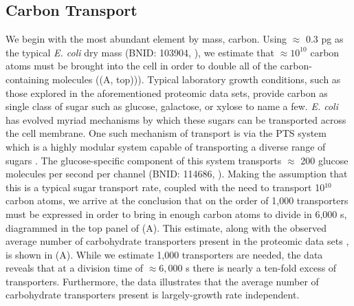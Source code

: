 \subsection{Carbon Transport}
We begin with the most abundant element by mass, carbon. Using $\approx$ 0.3
pg as the typical \textit{E. coli} dry mass (BNID: 103904, \cite{milo2010}),
we estimate that $\approx 10^{10}$ carbon atoms must be brought into the cell
in order to double all of the carbon-containing molecules
((A, top))). Typical laboratory growth conditions, such as
those explored in the aforementioned proteomic data sets, provide carbon as
single class of sugar such as glucose, galactose, or xylose to name a few.
\textit{E. coli} has evolved myriad mechanisms by which these sugars can be
transported across the cell membrane. One such mechanism of transport is via
the PTS system which is a highly modular system capable of transporting a
diverse range of sugars \citep{escalante2012}. The glucose-specific component
of this system transports $\approx$ 200 glucose molecules per second per
channel (BNID: 114686, \cite{milo2010}). Making the assumption that this is a
typical sugar transport rate, coupled with the need to transport 10$^{10}$
carbon atoms, we arrive at the conclusion that on the order of 1,000
transporters must be expressed in order to bring in enough carbon atoms to
divide in 6,000 s, diagrammed in the top panel of (A). This
estimate, along with the observed average number of carbohydrate transporters
present in the proteomic data sets \citep{schmidt2016,
peebo2015,valgepea2013,li2014}, is shown in (A). While we
estimate 1,000 transporters are needed, the data reveals that at a division
time of $\approx 6,000$ s there is nearly a ten-fold excess of transporters.
Furthermore, the data illustrates that the average number of carbohydrate
transporters present is largely-growth rate independent.


